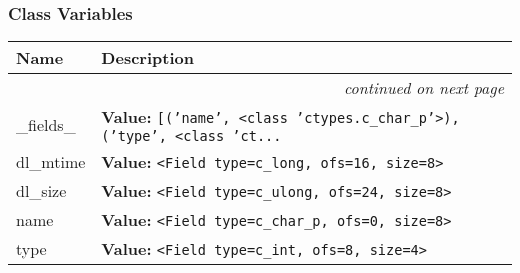 
  \subsubsection{Class Variables}

    \vspace{-1cm}
\hspace{\varindent}\begin{longtable}{|p{\varnamewidth}|p{\vardescrwidth}|l}
\cline{1-2}
\cline{1-2} \centering \textbf{Name} & \centering \textbf{Description}& \\
\cline{1-2}
\endhead\cline{1-2}\multicolumn{3}{r}{\small\textit{continued on next page}}\\\endfoot\cline{1-2}
\endlastfoot\raggedright \_\-f\-i\-e\-l\-d\-s\-\_\- & \raggedright \textbf{Value:} 
{\tt \texttt{[}\texttt{(}\texttt{'}\texttt{name}\texttt{'}\texttt{, }{\textless}class 'ctypes.c\_char\_p'{\textgreater}\texttt{)}\texttt{, }\texttt{(}\texttt{'}\texttt{type}\texttt{'}\texttt{, }{\textless}class 'ct\texttt{...}}&\\
\cline{1-2}
\raggedright d\-l\-\_\-m\-t\-i\-m\-e\- & \raggedright \textbf{Value:} 
{\tt {\textless}Field type=c\_long, ofs=16, size=8{\textgreater}}&\\
\cline{1-2}
\raggedright d\-l\-\_\-s\-i\-z\-e\- & \raggedright \textbf{Value:} 
{\tt {\textless}Field type=c\_ulong, ofs=24, size=8{\textgreater}}&\\
\cline{1-2}
\raggedright n\-a\-m\-e\- & \raggedright \textbf{Value:} 
{\tt {\textless}Field type=c\_char\_p, ofs=0, size=8{\textgreater}}&\\
\cline{1-2}
\raggedright t\-y\-p\-e\- & \raggedright \textbf{Value:} 
{\tt {\textless}Field type=c\_int, ofs=8, size=4{\textgreater}}&\\
\cline{1-2}
\end{longtable}



